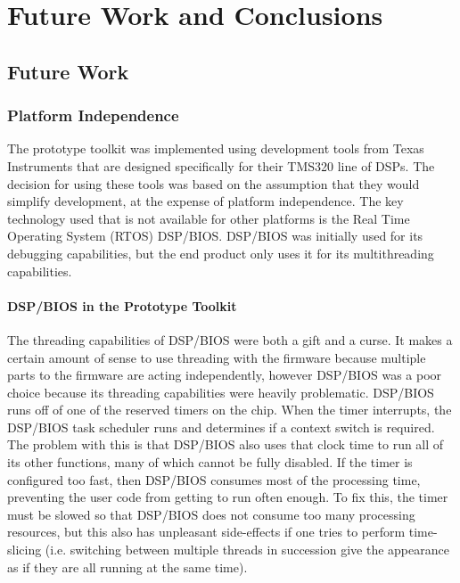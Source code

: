 \chapter{Future Work and Conclusions}\label{sec:conclusions}

\section{Future Work}\label{sec:conclusions:future_work}

\subsection{Platform Independence} \label{sec:conclusions:future_work:platform_independence}

The prototype toolkit was implemented using development tools from Texas Instruments that are designed specifically for their TMS320 line of DSPs. The decision for using these tools was based on the assumption that they would simplify development, at the expense of platform independence. The key technology used that is not available for other platforms is the Real Time Operating System (RTOS) DSP/BIOS. DSP/BIOS was initially used for its debugging capabilities, but the end product only uses it for its multithreading capabilities. 

\subsubsection{DSP/BIOS in the Prototype Toolkit}\label{sec:conclusions:future_work:platform_independence:dsp_bios}

The threading capabilities of DSP/BIOS were both a gift and a curse. It makes a certain amount of sense to use threading with the firmware because multiple parts to the firmware are acting independently, however DSP/BIOS was a poor choice because its threading capabilities were heavily problematic. DSP/BIOS runs off of one of the reserved timers on the chip. When the timer interrupts, the DSP/BIOS task scheduler runs and determines if a context switch is required. The problem with this is that DSP/BIOS also uses that clock time to run all of its other functions, many of which cannot be fully disabled. If the timer is configured too fast, then DSP/BIOS consumes most of the processing time, preventing the user code from getting to run often enough. To fix this, the timer must be slowed so that DSP/BIOS does not consume too many processing resources, but this also has unpleasant side-effects if one tries to perform time-slicing (i.e. switching between multiple threads in succession give the appearance as if they are all running at the same time). 


